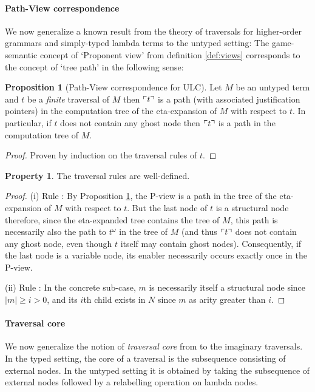 \documentclass{article}
\theoremstyle{definition}
\newtheorem{property}{Property}[section]
\newtheorem{proposition}{Proposition}[section]
\newcommand\Nodes{N}%
\begin{document}
\paragraph{Path-View correspondence}
We now generalize a known result from the theory of traversals for higher-order grammars \cite{Ong2006} and simply-typed lambda terms \cite[Proposition 4.29]{BlumPhd} to the untyped setting: The game-semantic concept of `Proponent view' from definition \ref{def:views} corresponds to the concept of `tree path' in the following sense:

\begin{proposition}[Path-View correspondence for ULC]
\label{prop:pathview_ulc}
Let $M$ be an untyped term and $t$ be a \emph{finite} traversal of $M$ then
$\ulcorner t \urcorner$ is a path (with associated justification pointers) in the computation tree of the eta-expansion of $M$ with respect to $t$.
In particular, if $t$ does not contain any ghost node then $\ulcorner t \urcorner$ is a path in the computation tree of $M$.
\end{proposition}
\begin{proof}
Proven by induction on the traversal rules of $t$.
\end{proof}

\begin{property}
The traversal rules are well-defined.
\end{property}
\begin{proof}
(i) Rule : By Proposition \ref{prop:pathview_ulc}, the P-view is a path in the tree of the eta-expansion of $M$ with respect to $t$. But the last node of $t$ is a structural node therefore, since the eta-expanded tree contains the tree of $M$, this path is necessarily also the path to $t^\omega$ in the tree of $M$ (and thus $\ulcorner t \urcorner$ does not contain any ghost node, even though $t$ itself may contain ghost nodes).
 Consequently, if the last node is a variable node, its enabler necessarily occurs exactly once in the P-view.

(ii) Rule : In the concrete sub-case, $m$ is necessarily itself a structural node since $|m|\geq i>0$, and its $i$th child exists in $\Nodes$ since $m$ as arity greater than $i$.
\end{proof}

\paragraph{Traversal core}

We now generalize the notion of \emph{traversal core} from \cite{BlumPhd} to the imaginary traversals.
In the typed setting, the core of a traversal is the subsequence consisting of external nodes. In the untyped setting it is obtained by taking the subsequence of external nodes followed by a relabelling operation on lambda nodes.
\end{document}
